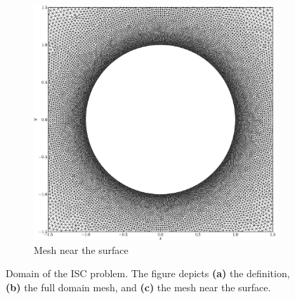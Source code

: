 \begin{figure}[!p]
     \begin{subfigure}[t]{0.3\textwidth}
             \includegraphics[width=\textwidth]{figures/eulerian/ISC_mesh_surface-crop.png}
             \caption{Mesh near the surface}
             \label{fig:ISC_mesh_surface}
     \end{subfigure}

     \caption{Domain of the ISC problem. The figure depicts \textbf{(a)} the definition, \textbf{(b)} the full domain mesh, and \textbf{(c)} the mesh near the surface.}
     \label{fig:ISCDomain}
	\end{figure}

